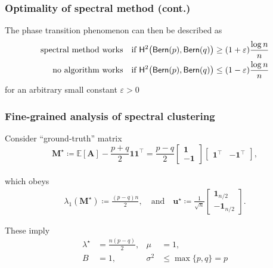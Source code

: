 \documentclass[compress,
mathserif,wide,%
]{beamer}
\begin{document}
\begin{frame}
	\frametitle{Optimality of spectral method (cont.)}
	
The phase transition phenomenon  can then be described as
%
\begin{align*}
\text{\text{spectral method works}}\quad & \text{if }\mathsf{H}^{2}\big(\mathsf{Bern}(p),\mathsf{Bern}(q)\big)\geq(1+\varepsilon)\frac{\log n}{n}\\
\text{no algorithm works}\quad & \text{if }\mathsf{H}^{2}\big(\mathsf{Bern}(p),\mathsf{Bern}(q)\big)\leq(1-\varepsilon)\frac{\log n}{n}
\end{align*}
%
for an arbitrary small constant $\varepsilon >0$
\end{frame}


\begin{frame}
\frametitle{Fine-grained analysis of spectral clustering}
Consider ``ground-truth'' matrix
\[
\bm{M}^{\star}\coloneqq\mathbb{E}[\bm{A}]-\frac{p+q}{2}\bm{1}\bm{1}^{\top}=\frac{p-q}{2}\left[\begin{array}{c}
\bm{1}\\
-\bm{1}
\end{array}\right]\left[\begin{array}{cc}
\bm{1}^{\top} & -\bm{1}^{\top}\end{array}\right], 
\] \\
which obeys 
\begin{align*}
	\lambda_{1}(\bm{M}^{\star})\coloneqq\frac{(p-q)n}{2},  
	\quad \text{and} \quad
	\bm{u}^{\star}  \coloneqq \frac{1}{\sqrt{n}}
	\left[\begin{array}{c}
		\bm{1}_{n/2}\\
		-\bm{1}_{n/2}
	\end{array}\right].
\end{align*}

	
These imply	\begin{align*}
\lambda^{\star} & =\tfrac{n(p-q)}{2}, & \mu & =1,\\
B & =1, & \sigma^{2} & \leq\max\{p,q\}=p
\end{align*}

\end{frame}
\end{document}
